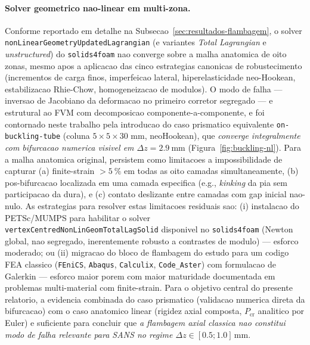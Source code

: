 \paragraph{Solver geometrico nao-linear em multi-zona.} Conforme reportado em detalhe na Subsecao~\ref{sec:resultados-flambagem}, o solver \texttt{nonLinearGeometryUpdatedLagrangian} (e variantes \emph{Total Lagrangian} e \emph{unstructured}) do \texttt{solids4foam} nao converge sobre a malha anatomica de oito zonas, mesmo apos a aplicacao das cinco estrategias canonicas de robustecimento (incrementos de carga finos, imperfeicao lateral, hiperelasticidade neo-Hookean, estabilizacao Rhie-Chow, homogeneizacao de modulos). O modo de falha --- inversao de Jacobiano da deformacao no primeiro corretor segregado --- e estrutural ao FVM com decomposicao componente-a-componente, e foi contornado neste trabalho pela introducao do caso prismatico equivalente \texttt{on-buckling-tube} (coluna $5 \times 5 \times 30$ mm, neoHookean), que \emph{converge integralmente com bifurcacao numerica visivel em $\Delta z = \SI{2.9}{\milli\meter}$} (Figura~\ref{fig:buckling-nl}). Para a malha anatomica original, persistem como limitacoes a impossibilidade de capturar (a) finite-strain $> \SI{5}{\percent}$ em todas as oito camadas simultaneamente, (b) pos-bifurcacao localizada em uma camada especifica (e.g., \emph{kinking} da pia sem participacao da dura), e (c) contato deslizante entre camadas com gap inicial nao-nulo. As estrategias para resolver estas limitacoes residuais sao: (i) instalacao do PETSc/MUMPS para habilitar o solver \texttt{vertexCentredNonLinGeomTotalLagSolid} disponivel no \texttt{solids4foam} (Newton global, nao segregado, inerentemente robusto a contrastes de modulo) --- esforco moderado; ou (ii) migracao do bloco de flambagem do estudo para um codigo FEA classico (\texttt{FEniCS}, \texttt{Abaqus}, \texttt{Calculix}, \texttt{Code\_Aster}) com formulacao de Galerkin --- esforco maior porem com maior maturidade documentada em problemas multi-material com finite-strain. Para o objetivo central do presente relatorio, a evidencia combinada do caso prismatico (validacao numerica direta da bifurcacao) com o caso anatomico linear (rigidez axial composta, $P_{\mathrm{cr}}$ analitico por Euler) e suficiente para concluir que \emph{a flambagem axial classica nao constitui modo de falha relevante para SANS no regime $\Delta z \in [0.5; 1.0]\,\si{\milli\meter}$}.
